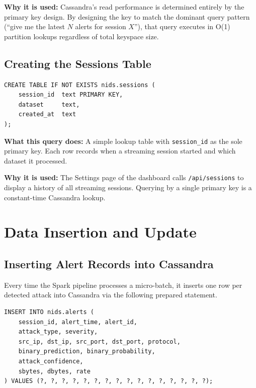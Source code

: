 \documentclass[12pt,a4paper]{report}
\begin{document}
\textbf{Why it is used:}  Cassandra's read performance is determined entirely
by the primary key design.  By designing the key to match the dominant query
pattern (``give me the latest $N$ alerts for session $X$''), that query
executes in O(1) partition lookups regardless of total keyspace size.

\subsection{Creating the Sessions Table}
\begin{lstlisting}[style=cqlstyle,
  caption={CQL: Create the nids.sessions table},
  label={lst:sessions-ddl}]
CREATE TABLE IF NOT EXISTS nids.sessions (
    session_id  text PRIMARY KEY,
    dataset     text,
    created_at  text
);
\end{lstlisting}

\textbf{What this query does:}  A simple lookup table with \texttt{session\_id}
as the sole primary key.  Each row records when a streaming session started
and which dataset it processed.

\textbf{Why it is used:}  The Settings page of the dashboard calls
\texttt{/api/sessions} to display a history of all streaming sessions.
Querying by a single primary key is a constant-time Cassandra lookup.

\section{Data Insertion and Update}

\subsection{Inserting Alert Records into Cassandra}
Every time the Spark pipeline processes a micro-batch, it inserts one row per
detected attack into Cassandra via the following prepared statement.

\begin{lstlisting}[style=cqlstyle,
  caption={CQL: Insert one alert record (prepared statement)},
  label={lst:insert-alert}]
INSERT INTO nids.alerts (
    session_id, alert_time, alert_id,
    attack_type, severity,
    src_ip, dst_ip, src_port, dst_port, protocol,
    binary_prediction, binary_probability,
    attack_confidence,
    sbytes, dbytes, rate
) VALUES (?, ?, ?, ?, ?, ?, ?, ?, ?, ?, ?, ?, ?, ?, ?, ?);
\end{lstlisting}
\end{document}
